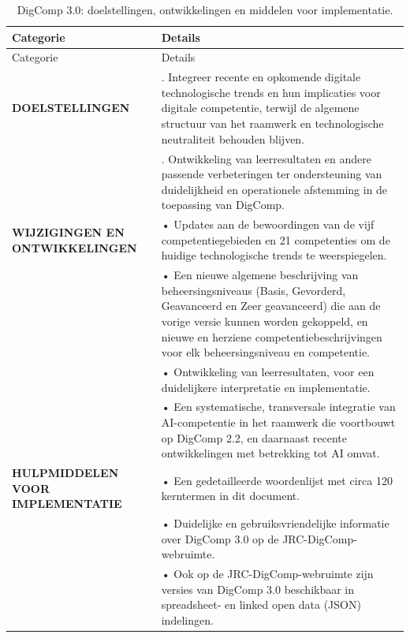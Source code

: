 \documentclass[
  dutch,
  letterpaper,
  DIV=11,
  numbers=noendperiod]{scrartcl}
\begin{document}
\begin{longtable}[]{@{}
  >{\raggedright\arraybackslash}p{}
  >{\raggedright\arraybackslash}p{}@{}}
\caption{DigComp 3.0: doelstellingen, ontwikkelingen en middelen voor
implementatie.}\label{tbl-doelen}\tabularnewline
\toprule\noalign{}
\begin{minipage}[b]{\linewidth}\raggedright
Categorie
\end{minipage} & \begin{minipage}[b]{\linewidth}\raggedright
Details
\end{minipage} \\
\midrule\noalign{}
\endfirsthead
\toprule\noalign{}
\begin{minipage}[b]{\linewidth}\raggedright
Categorie
\end{minipage} & \begin{minipage}[b]{\linewidth}\raggedright
Details
\end{minipage} \\
\midrule\noalign{}
\endhead
\bottomrule\noalign{}
\endlastfoot
\textbf{DOELSTELLINGEN} & 1. Integreer recente en opkomende digitale
technologische trends en hun implicaties voor digitale competentie,
terwijl de algemene structuur van het raamwerk en technologische
neutraliteit behouden blijven. \\
& 2. Ontwikkeling van leerresultaten en andere passende verbeteringen
ter ondersteuning van duidelijkheid en operationele afstemming in de
toepassing van DigComp. \\
\textbf{WIJZIGINGEN EN ONTWIKKELINGEN} & • Updates aan de bewoordingen
van de vijf competentiegebieden en 21 competenties om de huidige
technologische trends te weerspiegelen. \\
& • Een nieuwe algemene beschrijving van beheersingsniveaus (Basis,
Gevorderd, Geavanceerd en Zeer geavanceerd) die aan de vorige versie
kunnen worden gekoppeld, en nieuwe en herziene competentiebeschrijvingen
voor elk beheersingsniveau en competentie. \\
& • Ontwikkeling van leerresultaten, voor een duidelijkere interpretatie
en implementatie. \\
& • Een systematische, transversale integratie van AI-competentie in het
raamwerk die voortbouwt op DigComp 2.2, en daarnaast recente
ontwikkelingen met betrekking tot AI omvat. \\
\textbf{HULPMIDDELEN VOOR IMPLEMENTATIE} & • Een gedetailleerde
woordenlijst met circa 120 kerntermen in dit document. \\
& • Duidelijke en gebruiksvriendelijke informatie over DigComp 3.0 op de
JRC-DigComp-webruimte. \\
& • Ook op de JRC-DigComp-webruimte zijn versies van DigComp 3.0
beschikbaar in spreadsheet- en linked open data (JSON) indelingen. \\
\end{longtable}
\end{document}
